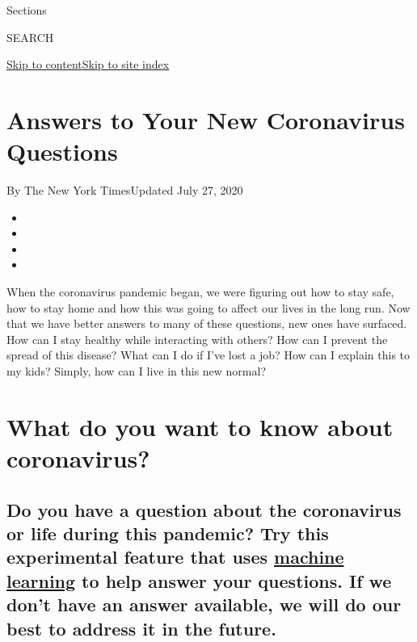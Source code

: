 Sections

SEARCH

\protect\hyperlink{site-content}{Skip to
content}\protect\hyperlink{site-index}{Skip to site index}

\hypertarget{answers-to-your-new-coronavirus-questions}{%
\section{Answers to Your New Coronavirus
Questions}\label{answers-to-your-new-coronavirus-questions}}

By The New York TimesUpdated July 27, 2020

\begin{itemize}
\item
\item
\item
\item
\end{itemize}

When the coronavirus pandemic began, we were figuring out how to stay
safe, how to stay home and how this was going to affect our lives in the
long run. Now that we have better answers to many of these questions,
new ones have surfaced. How can I stay healthy while interacting with
others? How can I prevent the spread of this disease? What can I do if
I've lost a job? How can I explain this to my kids? Simply, how can I
live in this new normal?

\hypertarget{what-do-you-want-to-know-about-coronavirus}{%
\section{What do you want to know about
coronavirus?}\label{what-do-you-want-to-know-about-coronavirus}}

\hypertarget{do-you-have-a-question-about-the-coronavirus-or-life-during-this-pandemic-try-this-experimental-feature-that-uses-machine-learning-to-help-answer-your-questions-if-we-dont-have-an-answer-available-we-will-do-our-best-to-address-it-in-the-future}{%
\subsection{\texorpdfstring{Do you have a question about the coronavirus
or life during this pandemic? Try this experimental feature that uses
\href{https://www.nytimes3xbfgragh.onion/2018/11/18/technology/artificial-intelligence-language.html?searchResultPosition=4}{machine
learning} to help answer your questions. If we don't have an answer
available, we will do our best to address it in the
future.}{Do you have a question about the coronavirus or life during this pandemic? Try this experimental feature that uses machine learning to help answer your questions. If we don't have an answer available, we will do our best to address it in the future.}}\label{do-you-have-a-question-about-the-coronavirus-or-life-during-this-pandemic-try-this-experimental-feature-that-uses-machine-learning-to-help-answer-your-questions-if-we-dont-have-an-answer-available-we-will-do-our-best-to-address-it-in-the-future}}

